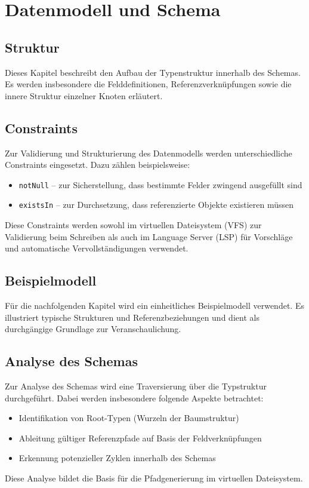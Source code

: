\section{Datenmodell und Schema}

\subsection{Struktur}
Dieses Kapitel beschreibt den Aufbau der Typenstruktur innerhalb des Schemas. Es werden insbesondere die Felddefinitionen, Referenzverknüpfungen sowie die innere Struktur einzelner Knoten erläutert.

\subsection{Constraints}
Zur Validierung und Strukturierung des Datenmodells werden unterschiedliche Constraints eingesetzt. Dazu zählen beispielsweise:
\begin{itemize}
	\item \texttt{notNull} – zur Sicherstellung, dass bestimmte Felder zwingend ausgefüllt sind
	\item \texttt{existsIn} – zur Durchsetzung, dass referenzierte Objekte existieren müssen
\end{itemize}
Diese Constraints werden sowohl im virtuellen Dateisystem (VFS) zur Validierung beim Schreiben als auch im Language Server (LSP) für Vorschläge und automatische Vervollständigungen verwendet.

\subsection{Beispielmodell}
Für die nachfolgenden Kapitel wird ein einheitliches Beispielmodell verwendet. Es illustriert typische Strukturen und Referenzbeziehungen und dient als durchgängige Grundlage zur Veranschaulichung.

\subsection{Analyse des Schemas}
Zur Analyse des Schemas wird eine Traversierung über die Typstruktur durchgeführt. Dabei werden insbesondere folgende Aspekte betrachtet:
\begin{itemize}
	\item Identifikation von Root-Typen (Wurzeln der Baumstruktur)
	\item Ableitung gültiger Referenzpfade auf Basis der Feldverknüpfungen
	\item Erkennung potenzieller Zyklen innerhalb des Schemas
\end{itemize}
Diese Analyse bildet die Basis für die Pfadgenerierung im virtuellen Dateisystem.
